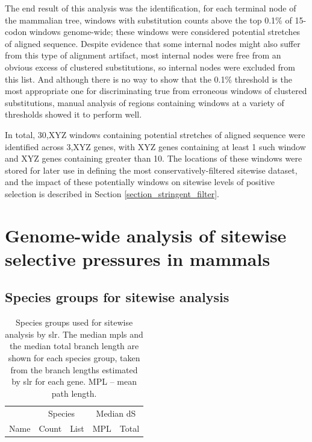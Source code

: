 The end result of this analysis was the identification, for each
terminal node of the mammalian tree, windows with \nsyn substitution
counts above the top 0.1\% of 15-codon windows genome-wide; these
windows were considered potential stretches of \nhom aligned
sequence. Despite evidence that some internal nodes might also suffer
from this type of alignment artifact, most internal nodes were free
from an obvious excess of clustered \nsyn substitutions, so internal
nodes were excluded from this list. And although there is no way to
show that the 0.1\% threshold is the most appropriate one for
discriminating true from erroneous windows of clustered substitutions,
manual analysis of regions containing windows at a variety of
thresholds showed it to perform well.

In total, 30,XYZ 
windows containing potential stretches of \nhom aligned sequence were
identified across 3,XYZ genes, with XYZ genes containing at least 1
such window and XYZ genes containing greater than 10. The locations of
these windows were stored for later use in defining the most
conservatively-filtered sitewise dataset, and the impact of these
potentially \nhom windows on sitewise levels of positive selection is
described in Section \ref{section_stringent_filter}.

\section{Genome-wide analysis of sitewise selective pressures in mammals}

\subsection{Species groups for sitewise analysis}

\begin{table}
\centering \footnotesize
\begin{tabular}{lrb{8cm}rr}
\toprule
 & \multicolumn{2}{c}{Species} & \multicolumn{2}{c}{Median dS} \\
\cmidrule(r){2-3} \cmidrule{4-5}
Name & Count & List & MPL & Total \\
  \midrule

\bottomrule
\end{tabular}
\caption{Species groups used for sitewise analysis by \ac{slr}. The
  median \acp{mpl} and the median total branch length are shown for
  each species group, taken from the \ngenes branch lengths estimated
  by \ac{slr} for each gene. MPL -- mean path length.}
\label{table_species_set_summary}
\end{table}

